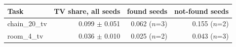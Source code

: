 \begin{tabular}{lrrr}
\hline
Task & TV share, all seeds & found seeds & not-found seeds \\
\hline
chain\_20\_tv & 0.099 $\pm$ 0.051 & 0.062 ($n$=3) & 0.155 ($n$=2) \\
room\_4\_tv & 0.036 $\pm$ 0.010 & 0.025 ($n$=2) & 0.043 ($n$=3) \\
\hline
\end{tabular}
